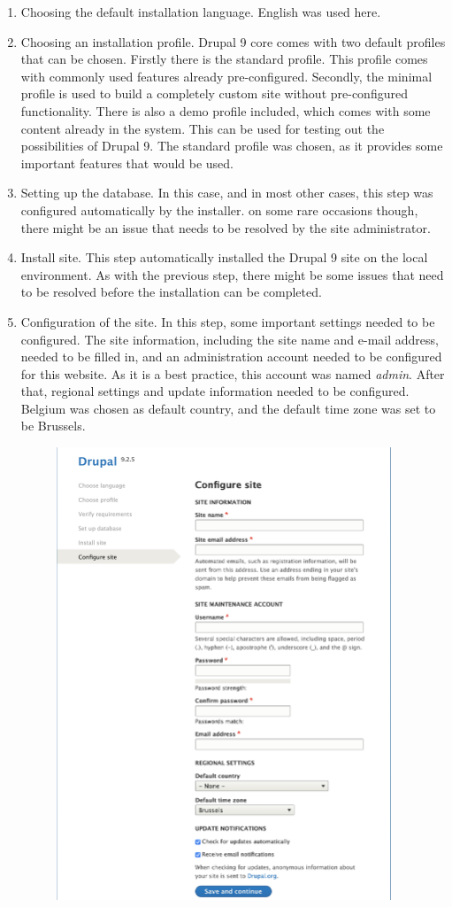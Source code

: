 \begin{enumerate}
	\item Choosing the default installation language. English was used here.
	\item Choosing an installation profile. Drupal 9 core comes with two default profiles that can be chosen. Firstly there is the standard profile. This profile comes with commonly used features already pre-configured. Secondly, the minimal profile is used to build a completely custom site without pre-configured functionality. There is also a demo profile included, which comes with some content already in the system. This can be used for testing out the possibilities of Drupal 9. The standard profile was chosen, as it provides some important features that would be used.
	\item Setting up the database. In this case, and in most other cases, this step was configured automatically by the installer. on some rare occasions though, there might be an issue that needs to be resolved by the site administrator. 
	\item Install site. This step automatically installed the Drupal 9 site on the local environment. As with the previous step, there might be some issues that need to be resolved before the installation can be completed.
	\item Configuration of the site. In this step, some important settings needed to be configured. The site information, including the site name and e-mail address, needed to be filled in, and an administration account needed to be configured for this website. As it is a best practice, this account was named \emph{admin}. After that, regional settings and update information needed to be configured. Belgium was chosen as default country, and the default time zone was set to be Brussels.
	\begin{figure}
		\centering
		\includegraphics[width=10cm]{./img/Install_Config.png}

\end{figure}
\end{enumerate}

